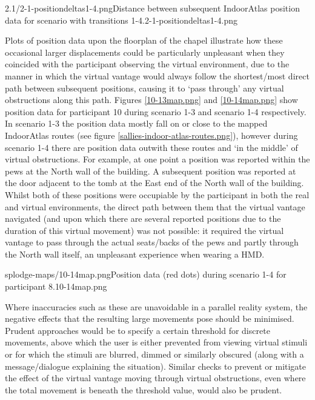        {2.1/2-1-positiondeltas1-4.png}{Distance between subsequent IndoorAtlas position data for scenario with transitions 1-4.}{2-1-positiondeltas1-4.png}

Plots of position data upon the floorplan of the chapel illustrate how these occasional larger displacements could be particularly unpleasant when they coincided with the participant observing the virtual environment, due to the manner in which the virtual vantage would always follow the shortest/most direct path between subsequent positions, causing it to `pass through' any virtual obstructions along this path. Figures \ref{10-13map.png} and \ref{10-14map.png} show position data for participant 10 during scenario 1-3 and scenario 1-4 respectively. In scenario 1-3 the position data mostly fall on or close to the mapped IndoorAtlas routes (see figure \ref{sallies-indoor-atlas-routes.png}), however during scenario 1-4 there are position data outwith these routes and `in the middle' of virtual obstructions. For example, at one point a position was reported within the pews at the North wall of the building. A subsequent position was reported at the door adjacent to the tomb at the East end of the North wall of the building. Whilst both of these positions were occupiable by the participant in both the real and virtual environments, the direct path between them that the virtual vantage navigated (and upon which there are several reported positions due to the duration of this virtual movement) was not possible: it required the virtual vantage to pass through the actual seats/backs of the pews and partly through the North wall itself, an unpleasant experience when wearing a HMD.

       {splodge-maps/10-14map.png}{Position data (red dots) during scenario 1-4 for participant 8.}{10-14map.png}

Where inaccuracies such as these are unavoidable in a parallel reality system, the negative effects that the resulting large movements pose should be minimised. Prudent approaches would be to specify a certain threshold for discrete movements, above which the user is either prevented from viewing virtual stimuli or for which the stimuli are blurred, dimmed or similarly obscured (along with a message/dialogue explaining the situation). Similar checks to prevent or mitigate the effect of the virtual vantage moving through virtual obstructions, even where the total movement is beneath the threshold value, would also be prudent.

